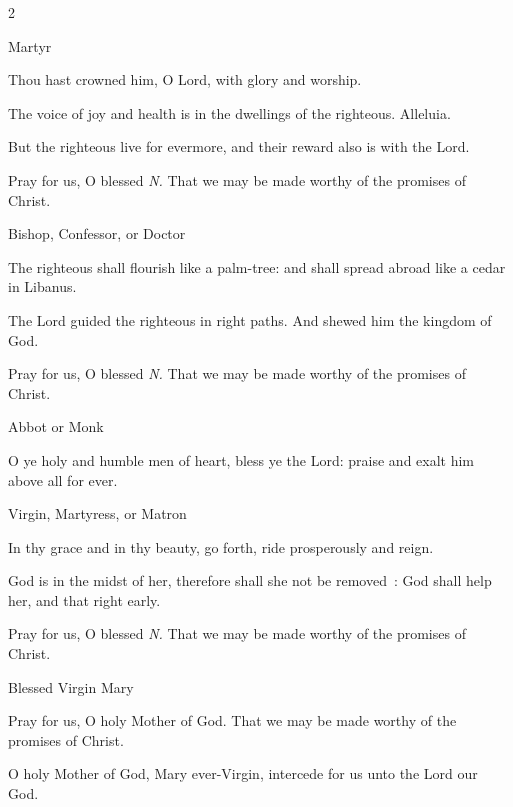 \begin{multicols}{2}
\centerline{\color{RubricRed}\small%
Martyr}
\par\noindent
Thou hast crowned him, O Lord, with glory and worship.

The voice of joy and health is in the dwellings of the righteous. Alleluia.

But the righteous live for evermore, and their reward also is with the Lord.

Pray for us, O blessed \textit{N.} That we may be made worthy of the promises of Christ.\\

\centerline{\color{RubricRed}\small%
Bishop, Confessor, or Doctor}
\par\noindent
The righteous shall flourish like a palm-tree: and shall spread abroad like a cedar in Libanus.

The Lord guided the righteous in right paths. And shewed him the kingdom of God.

Pray for us, O blessed \textit{N.} That we may be made worthy of the promises of Christ.%

\newcolumn

\centerline{\color{RubricRed}\small%
Abbot or Monk}
\par\noindent
O ye holy and humble men of heart, bless ye the Lord: praise and exalt him above all for ever.\\

\centerline{\color{RubricRed}\small%
Virgin, Martyress, or Matron}
\par\noindent
In thy grace and in thy beauty, go forth, ride prosperously and reign.

God is in the midst of her, therefore shall she not be removed~: God shall help her, and that right early.

Pray for us, O blessed \textit{N.} That we may be made worthy of the promises of Christ.\\

\centerline{\color{RubricRed}\small%
Blessed Virgin Mary}
\par\noindent
Pray for us, O holy Mother of God. That we may be made worthy of the promises of Christ.

O holy Mother of God, Mary ever-Virgin, intercede for us unto the Lord our God.\\


\end{multicols}
